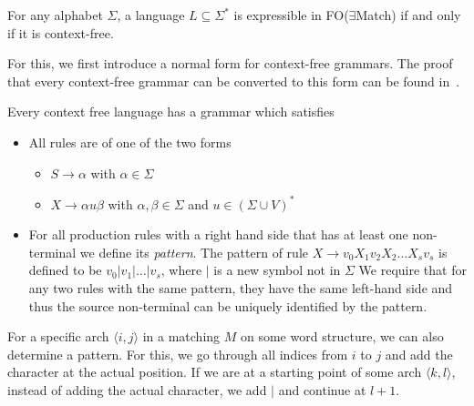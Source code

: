 \begin{theorem}
    For any alphabet $\Sigma$, a language $L \subseteq \Sigma^{*}$ is expressible in FO($\exists$Match) if and only if it is context-free.
\end{theorem}

For this, we first introduce a normal form for context-free grammars.
The proof that every context-free grammar can be converted to this form can be found in~\cite{Lautemann1995}.
\begin{lemma}
    Every context free language has a grammar which satisfies
    \begin{itemize}
        \setlength\itemsep{0.2em}
        \item All rules are of one of the two forms
        \begin{itemize}
            \setlength\itemsep{0.2em}
            \item $S \to \alpha$ with $\alpha \in \Sigma$
            \item $X \to \alpha u \beta$ with $\alpha, \beta \in \Sigma$ and $u \in (\Sigma \cup V)^{*}$
        \end{itemize}
        \item For all production rules with a right hand side that has at least one non-terminal we define its \emph{pattern}.
        The pattern of rule $X \to v_{0}X_{1}v_{2}X_{2}\dots X_{s}v_{s}$ is defined to be $v_{0}|v_{1}|\dots|v_{s}$, where $|$ is a new symbol not in $\Sigma$
        We require that for any two rules with the same pattern, they have the same left-hand side and thus the source non-terminal can be uniquely identified by the pattern.
    \end{itemize}
\end{lemma}

For a specific arch $\langle i, j \rangle$ in a matching $M$ on some word structure, we can also determine a pattern.
For this, we go through all indices from $i$ to $j$ and add the character at the actual position.
If we are at a starting point of some arch $\langle k, l \rangle$, instead of adding the actual character, we add $|$ and continue at $l + 1$.

